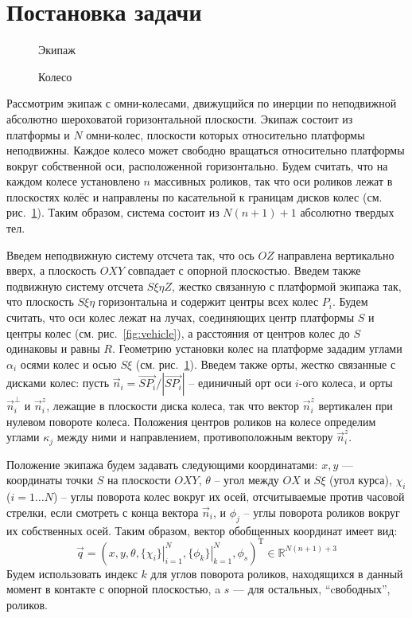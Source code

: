 \section{Постановка задачи}

\begin{figure}
        \centering
        \caption{Экипаж}
        \label{fig:vehicle}
    \endminipage
        \centering
        \caption{Колесо}
        \label{fig:wheel}
    \endminipage
\end{figure}

Рассмотрим экипаж с омни-колесами, движущийся по инерции по неподвижной абсолютно шероховатой горизонтальной плоскости. Экипаж состоит из платформы и $N$ омни-колес, плоскости которых относительно платформы неподвижны. Каждое колесо может свободно вращаться относительно платформы вокруг собственной оси, расположенной горизонтально. Будем считать, что на каждом колесе установлено $n$ массивных роликов, так что оси роликов лежат в плоскостях колёс и направлены по касательной к границам дисков колес (см. рис.~\ref{fig:wheel}). Таким образом, система состоит из $N(n+1) + 1$ абсолютно твердых тел. 

Введем неподвижную систему отсчета так, что ось $OZ$ направлена вертикально вверх, а плоскость $OXY$ совпадает с опорной плоскостью.
Введем также подвижную систему отсчета $S\xi\eta Z$, жестко связанную с платформой экипажа так, что плоскость $S\xi\eta$ горизонтальна и содержит центры всех колес $P_i$. Будем считать, что оси колес лежат на лучах, соединяющих центр платформы $S$ и центры колес (см. рис.~\ref{fig:vehicle}), а расстояния от центров колес до $S$ одинаковы и равны $R$. Геометрию установки колес на платформе зададим углами $\alpha_i$ осями колес и осью $S\xi$
(см. рис.~\ref{fig:wheel}). Введем также орты, жестко связанные с дисками колес: пусть $\vec{n}_i = \vec{SP_i}/|\vec{SP_i}|$ -- единичный орт оси $i$-ого колеса, и орты $\vec{n}_i^\perp$ и $\vec{n}_i^z$, лежащие в плоскости диска колеса, так что вектор $\vec{n}_i^z$ вертикален при нулевом повороте колеса. Положения центров роликов на колесе определим углами $\kappa_j$ между ними и направлением, противоположным вектору $\vec{n}_i^z$. 

Положение экипажа будем задавать следующими координатами:
$x, y$ --- координаты точки $S$ на плоскости $OXY$, $\theta$ -- угол между $OX$ и $S\xi$ (угол курса),
$\chi_i$ ($i = 1\dots N$) -- углы поворота колес вокруг их осей, отсчитываемые против часовой стрелки, если смотреть с конца вектора $\vec{n}_i$, и $\phi_j$ -- углы поворота роликов вокруг их собственных осей.
Таким образом, вектор обобщенных координат имеет вид:
$$\vec{q} = (x, y, \theta, \left.\{\chi_i\}\right|_{i=1}^N , \left.\{\phi_k\}\right|_{k=1}^N, \phi_s)^{\mathop{T}}\in\mathbb{R}^{N(n+1) + 3}$$ 
Будем использовать индекс $k$ для углов поворота роликов, находящихся в данный момент в контакте с опорной плоскостью, a $s$ --- для остальных,  ``cвободных'', роликов.

